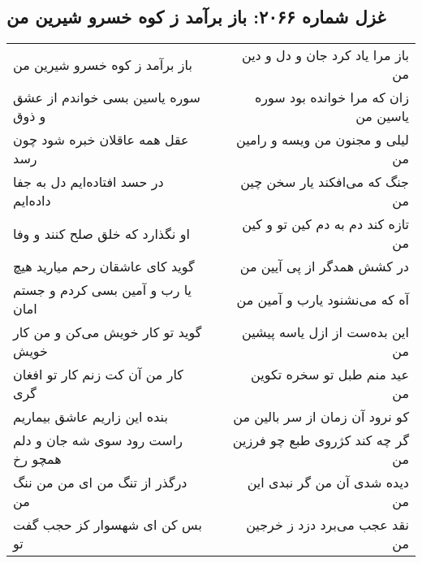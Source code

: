 \begin{center}
\section*{غزل شماره ۲۰۶۶: باز برآمد ز کوه خسرو شیرین من}
\label{sec:2066}
\begin{longtable}{l p{0.5cm} r}
باز برآمد ز کوه خسرو شیرین من
&&
باز مرا یاد کرد جان و دل و دین من
\\
سوره یاسین بسی خواندم از عشق و ذوق
&&
زان که مرا خوانده بود سوره یاسین من
\\
عقل همه عاقلان خبره شود چون رسد
&&
لیلی و مجنون من ویسه و رامین من
\\
در حسد افتاده‌ایم دل به جفا داده‌ایم
&&
جنگ که می‌افکند یار سخن چین من
\\
او نگذارد که خلق صلح کنند و وفا
&&
تازه کند دم به دم کین تو و کین من
\\
گوید کای عاشقان رحم میارید هیچ
&&
در کشش همدگر از پی آیین من
\\
یا رب و آمین بسی کردم و جستم امان
&&
آه که می‌نشنود یارب و آمین من
\\
گوید تو کار خویش می‌کن و من کار خویش
&&
این بده‌ست از ازل یاسه پیشین من
\\
کار من آن کت زنم کار تو افغان گری
&&
عید منم طبل تو سخره تکوین من
\\
بنده این زاریم عاشق بیماریم
&&
کو نرود آن زمان از سر بالین من
\\
راست رود سوی شه جان و دلم همچو رخ
&&
گر چه کند کژروی طبع چو فرزین من
\\
درگذر از تنگ من ای من من ننگ من
&&
دیده شدی آن من گر نبدی این من
\\
بس کن ای شهسوار کز حجب گفت تو
&&
نقد عجب می‌برد دزد ز خرجین من
\\
\end{longtable}
\end{center}
